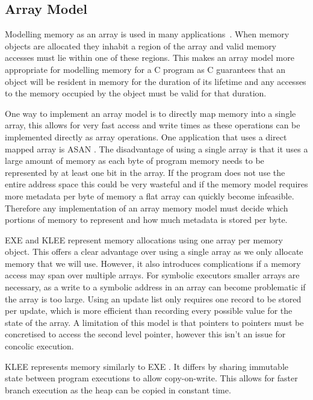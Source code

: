 \documentclass[12pt,twoside]{report}
\begin{document}
\subsection{Array Model}
Modelling memory as an array is used in many applications~\cite{cadar2008klee,cadar2008exe,leroy2008formal,poeplau2020symbolic}. When memory objects are allocated they inhabit a region of the array and valid memory accesses must lie within one of these regions. This makes an array model more appropriate for modelling memory for a C program as C guarantees that an object will be resident in memory for the duration of its lifetime and any accesses to the memory occupied by the object must be valid for that duration.

One way to implement an array model is to directly map memory into a single array, this allows for very fast access and write times as these operations can be implemented directly as array operations. One application that uses a direct mapped array is ASAN \cite{180957}. The disadvantage of using a single array is that it uses a large amount of memory as each byte of program memory needs to be represented by at least one bit in the array. If the program does not use the entire address space this could be very wasteful and if the memory model requires more metadata per byte of memory a flat array can quickly become infeasible. Therefore any implementation of an array memory model must decide which portions of memory to represent and how much metadata is stored per byte.

EXE \cite{cadar2008exe} and KLEE \cite{cadar2008klee} represent memory allocations using one array per memory object. This offers a clear advantage over using a single array as we only allocate memory that we will use. However, it also introduces complications if a memory access may span over multiple arrays. For symbolic executors smaller arrays are necessary, as a write to a symbolic address in an array can become problematic if the array is too large. Using an update list only requires one record to be stored per update, which is more efficient than recording every possible value for the state of the array. A limitation of this model is that pointers to pointers must be concretised to access the second level pointer, however this isn't an issue for concolic execution.

KLEE \cite{cadar2008klee} represents memory similarly to EXE \cite{cadar2008exe}. It differs by sharing immutable state between program executions to allow copy-on-write. This allows for faster branch execution as the heap can be copied in constant time.
\end{document}
